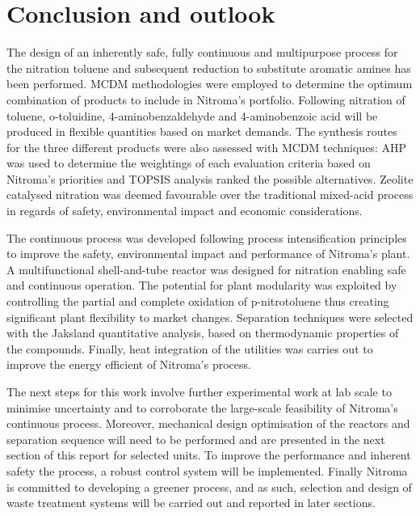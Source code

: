 \section{Conclusion and outlook}

The design of an inherently safe, fully continuous and multipurpose process for the nitration toluene and subsequent reduction to substitute aromatic amines has been performed. MCDM methodologies were employed to determine the optimum combination of products to include in Nitroma's portfolio. Following nitration of toluene, o-toluidine, 4-aminobenzaldehyde and 4-aminobenzoic acid will be produced in flexible quantities based on market demands. The synthesis routes for the three different products were also assessed with MCDM techniques: AHP was used to determine the weightings of each evaluation criteria based on Nitroma's priorities and TOPSIS analysis ranked the possible alternatives. Zeolite catalysed nitration was deemed favourable over the traditional mixed-acid process in regards of safety, environmental impact and economic considerations. 

The continuous process was developed following process intensification principles to improve the safety, environmental impact and performance of Nitroma's plant. A multifunctional shell-and-tube reactor was designed for nitration enabling safe and continuous operation. The potential for plant modularity was exploited by controlling the partial and complete oxidation of p-nitrotoluene thus creating significant plant flexibility to market changes. Separation techniques were selected with the Jaksland quantitative analysis, based on thermodynamic properties of the compounds. Finally, heat integration of the utilities was carries out to improve the energy efficient of Nitroma's process.


The next steps for this work involve further experimental work at lab scale to minimise uncertainty and to corroborate the large-scale feasibility of Nitroma's continuous process. Moreover, mechanical design optimisation of the reactors and separation sequence will need to be performed and are presented in the next section of this report for selected units. To improve the performance and inherent safety  the process, a robust control system will be implemented. Finally Nitroma is committed to developing a greener process, and as such, selection and design of waste treatment systems will be carried out and reported in later sections.